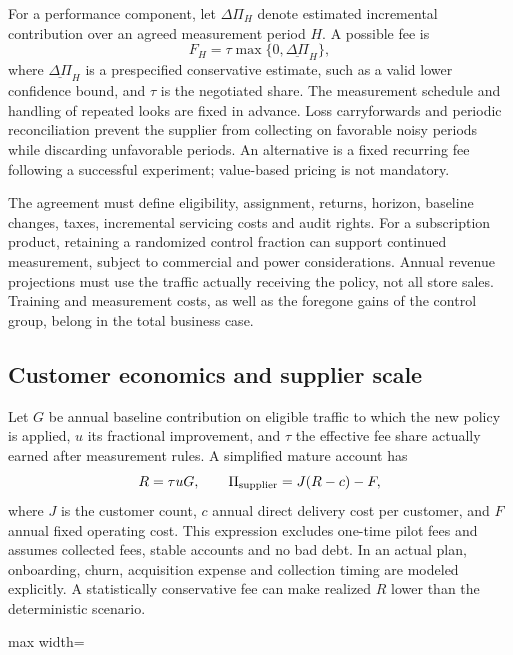 \documentclass[11pt]{article}
\theoremstyle{remark}\newtheorem{example}{Example}
\begin{document}
For a performance component, let $\Delta\Pi_H$ denote estimated incremental
contribution over an agreed measurement period $H$. A possible fee is
\begin{equation}\label{eq:fee}
 F_H=\tau\max\{0,\underline{\Delta\Pi}_H\},
\end{equation}
where $\underline{\Delta\Pi}_H$ is a prespecified conservative estimate, such as
a valid lower confidence bound, and $\tau$ is the negotiated share. The
measurement schedule and handling of repeated looks are fixed in advance.
Loss carryforwards and periodic reconciliation prevent the supplier from
collecting on favorable noisy periods while discarding unfavorable periods.
An alternative is a fixed recurring fee following a successful experiment;
value-based pricing is not mandatory.

The agreement must define eligibility, assignment, returns, horizon, baseline
changes, taxes, incremental servicing costs and audit rights. For a subscription
product, retaining a randomized control fraction can support continued
measurement, subject to commercial and power considerations. Annual revenue
projections must use the traffic actually receiving the policy, not all store
sales. Training and measurement costs, as well as the foregone gains of the
control group, belong in the total business case.

\subsection{Customer economics and supplier scale}
Let $G$ be annual baseline contribution on eligible traffic to which the new
policy is applied, $u$ its fractional improvement, and $\tau$ the effective fee
share actually earned after measurement rules. A simplified mature account has
\begin{equation}\label{eq:scale}
 R=\tau uG,\qquad
 \Pi_{
\rm supplier}=J(R-c)-F,
\end{equation}
where $J$ is the customer count, $c$ annual direct delivery cost per customer,
and $F$ annual fixed operating cost. This expression excludes one-time pilot
fees and assumes collected fees, stable accounts and no bad debt. In an actual
plan, onboarding, churn, acquisition expense and collection timing are modeled
explicitly. A statistically conservative fee can make realized $R$ lower than
the deterministic scenario.

\begin{table}[htbp]\centering\small
\begin{adjustbox}{max width=\textwidth}\end{adjustbox}
\caption{Illustrative mature-account economics: $G=\$10$ million,
$\tau=15\%$, $c=\$12,000$ and $F=\$600,000$ annually. The last column targets
\$1 million annual operating profit before tax, with customer counts rounded up.
The uplifts are assumptions.}\label{tab:merchantecon}
\end{table}
\end{document}
